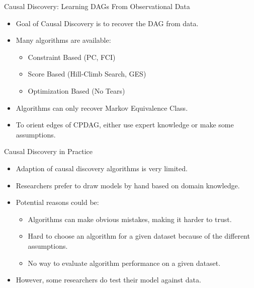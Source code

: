 \documentclass{beamer}
\begin{document}
\begin{frame}{Causal Discovery: Learning DAGs From Observational Data}
	\begin{figure}
		\centering
	\end{figure}

	\begin{itemize}
		\item Goal of Causal Discovery is to recover the DAG from data.
		\item Many algorithms are available:
			\begin{itemize}
				\item Constraint Based (PC, FCI)
				\item Score Based (Hill-Climb Search, GES)
				\item Optimization Based (No Tears)
			\end{itemize}
		\item Algorithms can only recover Markov Equivalence Class.
		\item To orient edges of CPDAG, either use expert knowledge or make some assumptions.
	\end{itemize}
\end{frame}

\begin{frame}{Causal Discovery in Practice}
	\begin{itemize}
		\item Adaption of causal discovery algorithms is very limited.
		\item Researchers prefer to draw models by hand based on domain knowledge.
		\item Potential reasons could be:
			\begin{itemize}
				\item Algorithms can make obvious mistakes, making it harder to trust.
				\item Hard to choose an algorithm for a given dataset because of the different assumptions.
				\item No way to evaluate algorithm performance on a given dataset.
			\end{itemize}
		\item However, some researchers do test their model against data.
	\end{itemize}
\end{frame}
\end{document}
